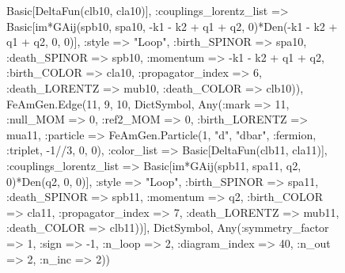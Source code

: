 \documentclass{revtex4}
\begin{document}
\begin{figure}[!htb]
\begin{center}
{Basic[DeltaFun(clb10, cla10)], :couplings_lorentz_list => Basic[im*GAij(spb10, spa10, -k1 - k2 + q1 + q2, 0)*Den(-k1 - k2 + q1 + q2, 0, 0)], :style => "Loop", :birth_SPINOR => spa10, :death_SPINOR => spb10, :momentum => -k1 - k2 + q1 + q2, :birth_COLOR => cla10, :propagator_index => 6, :death_LORENTZ => mub10, :death_COLOR => clb10)), FeAmGen.Edge(11, 9, 10, Dict{Symbol, Any}(:mark => 11, :null_MOM => 0, :ref2_MOM => 0, :birth_LORENTZ => mua11, :particle => FeAmGen.Particle(1, "d", "dbar", :fermion, :triplet, -1//3, 0, 0), :color_list => Basic[DeltaFun(clb11, cla11)], :couplings_lorentz_list => Basic[im*GAij(spb11, spa11, q2, 0)*Den(q2, 0, 0)], :style => "Loop", :birth_SPINOR => spa11, :death_SPINOR => spb11, :momentum => q2, :birth_COLOR => cla11, :propagator_index => 7, :death_LORENTZ => mub11, :death_COLOR => clb11))], Dict{Symbol, Any}(:symmetry_factor => 1, :sign => -1, :n_loop => 2, :diagram_index => 40, :n_out => 2, :n_inc => 2)) 
}
\end{center}
\end{figure}
\end{document}
